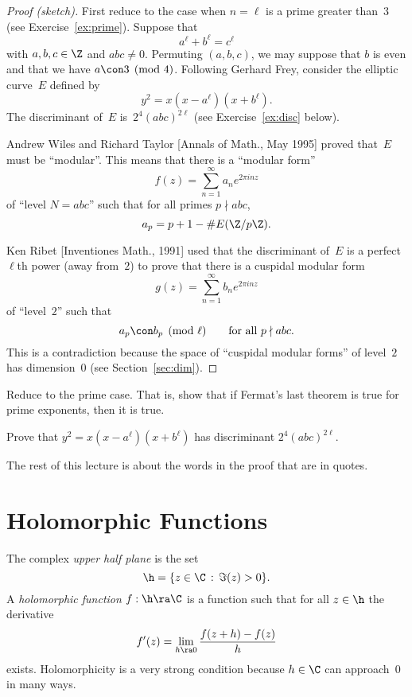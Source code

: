 \documentclass[11pt]{report}
\begin{document}
\begin{proof}[Proof (sketch)]
  First reduce to the case when $n=\ell$ is
  a prime greater than~$3$ (see Exercise~\ref{ex:prime}).  Suppose that
  $$
    a^\ell + b^\ell = c^\ell
  $$
  with $a, b,c\in\Z$ and $abc\neq 0$.
  Permuting $(a,b,c)$, we may suppose that $b$ is even and
  that we have $a\con 3\pmod{4}$.
  Following Gerhard Frey, consider the elliptic curve~$E$ defined by
  $$
    y^2 = x(x-a^{\ell})(x+b^{\ell}).
  $$
  The discriminant of~$E$ is~$2^4(abc)^{2\ell}$
  (see Exercise~\ref{ex:disc} below).


  Andrew Wiles and Richard Taylor [Annals of Math., May 1995] proved that~$E$
  must be ``modular''.  This means that there is a ``modular form''
  $$f(z) = \sum_{n=1}^{\infty} a_n e^{2\pi i n z}$$
  of ``level $N=abc$''
  such that for all primes $p\nmid abc$,
  $$
    a_p = p+1-\#E(\Z/p\Z).
  $$

  Ken Ribet [Inventiones Math., 1991] used that the
  discriminant of~$E$ is a perfect~$\ell$th power (away from~$2$)
  to prove that there is  a cuspidal modular form
  $$
    g(z) = \sum_{n=1}^{\infty} b_n e^{2\pi i n z}
  $$
  of ``level~$2$'' such that
  $$
    a_p \con b_p \pmod{\ell}\qquad\text{for all }p\nmid abc.
  $$
  This is a contradiction because
  the space of ``cuspidal modular forms'' of level~$2$
  has dimension~$0$ (see Section~\ref{sec:dim}).
\end{proof}

\begin{exercise}\label{ex:prime}
  Reduce to the prime case.  That is, show that if Fermat's last theorem is
  true for prime exponents, then it is true.
\end{exercise}

\begin{exercise}\label{ex:disc}
  Prove that
  $y^2 = x(x-a^{\ell})(x+b^{\ell})$ has
  discriminant $2^4(abc)^{2\ell}$.
\end{exercise}

The rest of this lecture is about the words in the proof that
are in quotes.

\section{Holomorphic Functions}
The complex {\em upper half plane} is the set
$$
  \h = \{z\in\C \,:\, \Im(z) > 0\}.
$$
A {\em holomorphic function} $f:\h\ra\C$ is a function
such that for all $z\in\h$ the derivative
$$
  f'(z) = \lim_{h\ra 0} \frac{f(z+h) - f(z)}{h}
$$
exists.  Holomorphicity is a very strong condition
because $h\in\C$ can approach~$0$ in many ways.
\end{document}
